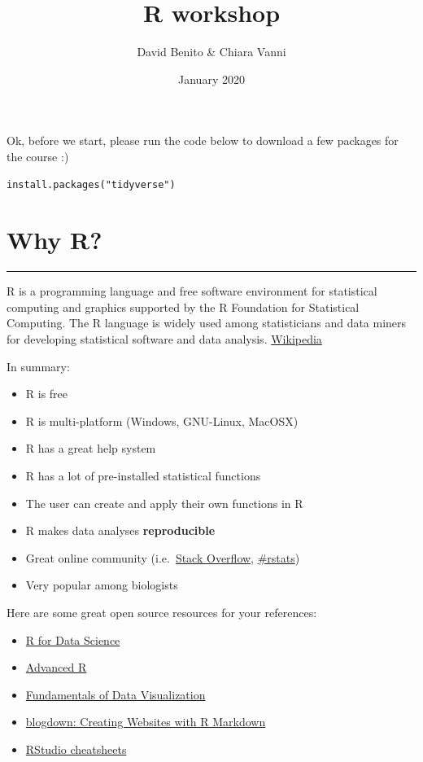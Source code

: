 \documentclass[
]{article}
\title{R workshop}
\author{David Benito \& Chiara Vanni}
\date{January 2020}
\providecommand{\tightlist}{%
  \setlength{\itemsep}{0pt}\setlength{\parskip}{0pt}}
\begin{document}
\maketitle

Ok, before we start, please run the code below to download a few
packages for the course :)

\begin{verbatim}
install.packages("tidyverse")
\end{verbatim}

\hypertarget{why-r}{%
\section{Why R?}\label{why-r}}

\begin{center}\rule{0.5\linewidth}{\linethickness}\end{center}

R is a programming language and free software environment for
statistical computing and graphics supported by the R Foundation for
Statistical Computing. The R language is widely used among statisticians
and data miners for developing statistical software and data analysis.
\href{https://en.wikipedia.org/wiki/R_(programming_language)}{Wikipedia}

In summary:

\begin{itemize}
\tightlist
\item
  R is free
\item
  R is multi-platform (Windows, GNU-Linux, MacOSX)
\item
  R has a great help system
\item
  R has a lot of pre-installed statistical functions
\item
  The user can create and apply their own functions in R
\item
  R makes data analyses \textbf{reproducible}
\item
  Great online community
  (i.e.~\href{https://stackoverflow.com/questions/tagged/r}{Stack
  Overflow},
  \href{https://twitter.com/search?q=\%23rstats\&src=typd}{\#rstats})
\item
  Very popular among biologists
\end{itemize}

Here are some great open source resources for your references:

\begin{itemize}
\tightlist
\item
  \href{https://r4ds.had.co.nz/}{R for Data Science}
\item
  \href{http://adv-r.had.co.nz/}{Advanced R}
\item
  \href{https://serialmentor.com/dataviz/}{Fundamentals of Data
  Visualization}
\item
  \href{https://bookdown.org/yihui/blogdown/}{blogdown: Creating
  Websites with R Markdown}
\item
  \href{https://www.rstudio.com/resources/cheatsheets/}{RStudio
  cheatsheets}
\end{itemize}
\end{document}
